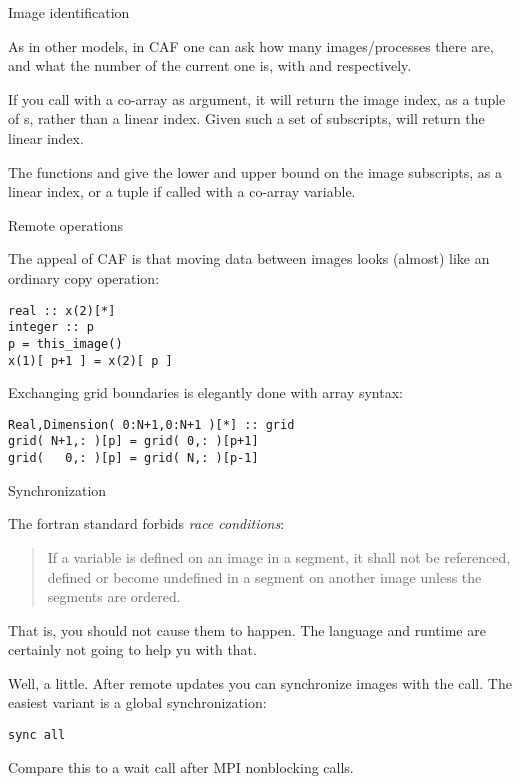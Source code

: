  {Image identification}

As in other models, in \ac{CAF} one can ask how many images/processes there are,
and what the number of the current one is,
with  and  respectively.


If you call  with a co-array as argument,
it will return the image index, as a tuple of s,
rather than a linear index.
Given such a set of subscripts, 
will return the linear index.

The functions  and 
give the lower and upper bound on the image subscripts,
as a linear index, or a tuple if called with a co-array variable.

 {Remote operations}

The appeal of \ac{CAF} is that moving data between images
looks (almost) like an ordinary copy operation:
\begin{lstlisting}
real :: x(2)[*]
integer :: p
p = this_image()
x(1)[ p+1 ] = x(2)[ p ]
\end{lstlisting}

Exchanging grid boundaries is elegantly done with array syntax:
\begin{lstlisting}
Real,Dimension( 0:N+1,0:N+1 )[*] :: grid
grid( N+1,: )[p] = grid( 0,: )[p+1]
grid(   0,: )[p] = grid( N,: )[p-1]
\end{lstlisting}

 {Synchronization}

The fortran standard forbids
\emph{race conditions}:
\begin{quote}
  If a variable is defined on an image in a segment, it shall not be
  referenced, defined or become undefined in a segment on another
  image unless the segments are ordered.
\end{quote}
That is, you should not cause them to happen. The language and runtime
are certainly not going to help yu with that.

Well, a little. After remote updates you can synchronize images
with the  call.
The easiest variant is a global synchronization:
\begin{lstlisting}
sync all
\end{lstlisting}
Compare this to a wait call after MPI nonblocking calls.

